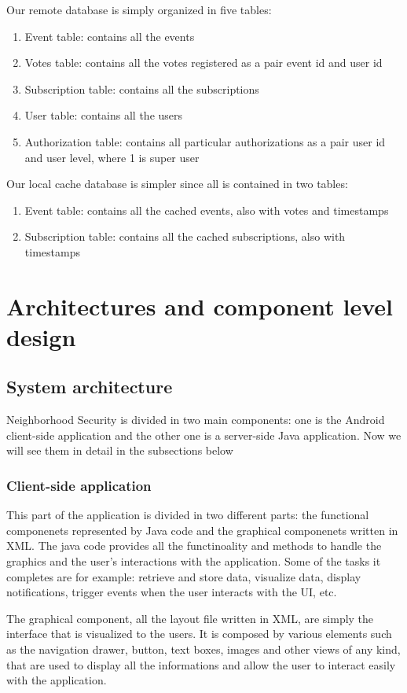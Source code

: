 \documentclass[a4paper]{scrreprt}
\begin{document}
\par Our remote database is simply organized in five tables:
\begin{enumerate}
\item Event table: contains all the events
\item Votes table: contains all the votes registered as a pair event id and user id
\item Subscription table: contains all the subscriptions
\item User table: contains all the users
\item Authorization table: contains all particular authorizations as a pair user id and user level, where 1 is super user
\end{enumerate}

\par Our local cache database is simpler since all is contained in two tables:
\begin {enumerate}
\item Event table: contains all the cached events, also with votes and timestamps
\item Subscription table: contains all the cached subscriptions, also with timestamps
\end{enumerate}
\chapter{Architectures and component level design}

\section{System architecture}
Neighborhood Security is divided in two main components: one is the Android client-side application and the other one is a server-side Java application. Now we will see them in detail in the subsections below

\subsection{Client-side application}
This part of the application is divided in two different parts: the functional componenets represented by Java code and the graphical componenets written in XML. The java code provides all the functinoality and methods to handle the graphics and the user's interactions with the application. Some of the tasks it completes are for example: retrieve and store data, visualize data, display notifications, trigger events when the user interacts with the UI, etc.
\par The graphical component, all the layout file written in XML, are simply the interface that is visualized to the users. It is composed by various elements such as the navigation drawer, button, text boxes, images and other views of any kind, that are used to display all the informations and allow the user to interact easily with the application.
\end{document}
